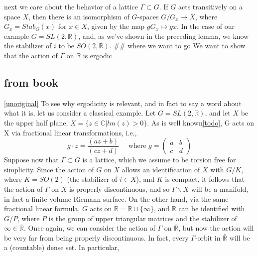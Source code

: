 \documentclass[
]{article}
\begin{document}
next we care about the behavior of a lattice \(\Gamma \subset G\). If
\(G\) acts transitively on a space \(X\), then there is an isomorphism
of \(G\)-spaces \(G/G_x \rightarrow X\), where \(G_x = Stab_G (x)\) for
\(x \in X\), given by the map \(gG_x \mapsto gx\). In the case of our
example \(G = SL(2, \mathbb{R})\), and, as we've shown in the preceding
lemma, we know the stabilizer of \(i\) to be \(SO(2,\mathbb{R})\). \#\#
where we want to go We want to show that the action of \(\Gamma\) on
\(\bar{\mathbb{R}}\) is ergodic

\hypertarget{from-book}{%
\subsection{from book}\label{from-book}}

\href{Zimmer\%20p.4}{{[}unoriginal{]}} To see why ergodicity is
relevant, and in fact to say a word about what it is, let us consider a
classical example. Let \(G = SL(2, \mathbb{R})\), and let \(X\) be the
upper half plane, \(X= \{z \in \mathbb{C} | lm(z) > 0\}\). As is well
known\href{upper\%20half\%20plane,\%20möbius\%20transforms,\%20give\%20reference\%20to\%20misc\%20things.\%20and\%20figure\%20out\%20what\%20the\%20actual\%20example\%20is.\%20figure\%20out\%20what\%20the\%20theorem\%20tries\%20to\%20answer.}{{[}todo{]}},
G acts on X via fractional linear transformations, i.e., \[
g \cdot z=\frac{(az+b)}{(cz+d)}
\quad
\text{ where }g=
\begin{pmatrix}a & b \\ c & d\end{pmatrix}
\] Suppose now that \(\Gamma \subset G\) is a lattice, which we assume
to be torsion free for simplicity. Since the action of \(G\) on \(X\)
allows an identification of \(X\) with \(G/K\), where \(K = SO(2)\) (the
stabilizer of \(i \in X\)), and \(K\) is compact, it follows that the
action of \(\Gamma\) on \(X\) is properly discontinuous, and so
\(\Gamma\backslash X\) will be a manifold, in fact a finite volume
Riemann surface. On the other hand, via the same fractional linear
formula, \(G\) acts on
\(\bar{\mathbb{R}} = \mathbb{R} \cup \{ \infty \}\), and
\(\bar{\mathbb{R}}\) can be identified with \(G/P\), where \(P\) is the
group of upper triangular matrices and the stabilizer of
\(\infty \in \bar{\mathbb{R}}\). Once again, we can consider the action
of \(\Gamma\) on \(\bar{\mathbb{R}}\), but now the action will be very
far from being properly discontinuous. In fact, every \(\Gamma\)-orbit
in \(\bar{\mathbb{R}}\) will be a (countable) dense set. In particular,
\end{document}
